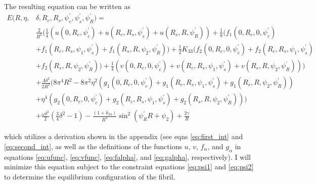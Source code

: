 \documentclass[12pt]{article}
\begin{document}
The resulting equation can be written as
\begin{align}\label{eq:piecewise_E}
E(R,\eta,&\delta,R_c,R_s,\psi_c^{\prime},\psi_s^{\prime},\psi_R^{\prime})=\nonumber\\
&\frac{2}{R^2}\bigg(\frac{1}{4}(u(0,R_c,\psi_c^{\prime})+u(R_c,R_s,\psi_s^{\prime})+u(R_s,R,\psi_R^{\prime}))+\frac{1}{8}(f_1(0,R_c,0,\psi_c^{\prime})\nonumber\\
&+f_1(R_c,R_s,\psi_1,\psi_s^{\prime})+f_1(R_s,R,\psi_2,\psi_R^{\prime}))+\frac{1}{2}K_{33}(f_2(0,R_c,0,\psi_c^{\prime})+f_2(R_c,R_s,\psi_1,\psi_s^{\prime})\nonumber\\
&+f_2(R_s,R,\psi_2,\psi_R^{\prime}))+\frac{1}{4}(v(0,R_c,0,\psi_c^{\prime})+v(R_c,R_s,\psi_1,\psi_s^{\prime})+v(R_s,R,\psi_2,\psi_R^{\prime}))\bigg)\nonumber\\
&+\frac{\Lambda\delta^2}{2R^2}\bigg(8\pi^4R^2-8\pi^2\eta^2(g_1(0,R_c,0,\psi_c^{\prime})+g_1(R_c,R_s,\psi_1,\psi_s^{\prime})+g_1(R_s,R,\psi_2,\psi_R^{\prime}))\nonumber\\
&+\eta^4(g_2(0,R_c,0,\psi_c^{\prime})+g_2(R_c,R_s,\psi_1,\psi_s^{\prime})+g_2(R_s,R,\psi_2,\psi_R^{\prime}))\bigg)\nonumber\\
&+\frac{\omega\delta^2}{2}\left(\frac{3}{4}\delta^2-1\right)-\frac{(1+k_{24})}{R^2}\sin^2(\psi_R^{\prime}R+\psi_2)+\frac{2\gamma}{R}
\end{align}

which utilizes a derivation shown in the appendix (see eqns \ref{eq:first_int} and \ref{eq:second_int}, as well as the definitions of the functions $u$, $v$, $f_{\alpha}$, and $g_{\alpha}$ in equations \ref{eq:ufunc}, \ref{eq:vfunc}, \ref{eq:falpha}, and \ref{eq:galpha}, respectively). I will minimize this equation subject to the constraint equations \ref{eq:psi1} and \ref{eq:psi2} to determine the equilibrium configuration of the fibril.
\end{document}
